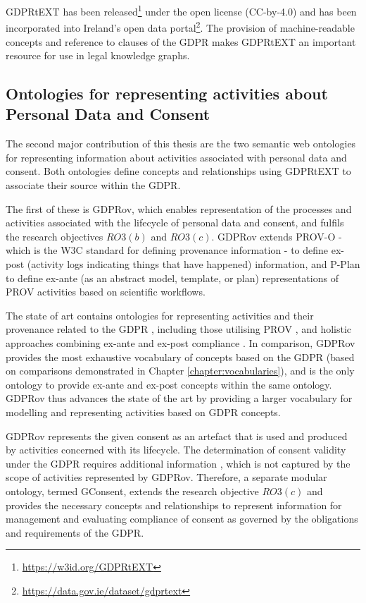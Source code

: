 GDPRtEXT has been released\footnote{\url{https://w3id.org/GDPRtEXT}} under the open license (CC-by-4.0) and has been incorporated into Ireland's open data portal\footnote{\url{https://data.gov.ie/dataset/gdprtext}}.
The provision of machine-readable concepts and reference to clauses of the GDPR makes GDPRtEXT an important resource for use in legal knowledge graphs.

\subsection{Ontologies for representing activities about Personal Data and Consent}\label{sec:contributions:ontologies}
The second major contribution of this thesis are the two semantic web ontologies for representing information about activities associated with personal data and consent. Both ontologies define concepts and relationships using GDPRtEXT to associate their source within the GDPR.

The first of these is GDPRov, which enables representation of the processes and activities associated with the lifecycle of personal data and consent, and  fulfils the research objectives $RO3(b)$ and $RO3(c)$.
GDPRov extends PROV-O \cite{lebo_prov-o:_2013} - which is the W3C standard for defining provenance information - to define ex-post (activity logs indicating things that have happened) information, and P-Plan \cite{garijo_p-plan_2014} to define ex-ante (as an abstract model, template, or plan) representations of PROV activities based on scientific workflows.

The state of art contains ontologies for representing activities and their provenance related to the GDPR \cite{pasquier_data_2018,palmirani_pronto:_2018-1}, including those utilising PROV \cite{belhajjame_provenance_2018,bonatti_special_2018-1}, and holistic approaches combining ex-ante and ex-post compliance \cite{dullaert_d3.4_2019}.
In comparison, GDPRov provides the most exhaustive vocabulary of concepts based on the GDPR (based on comparisons demonstrated in Chapter \ref{chapter:vocabularies}), and is the only ontology to provide ex-ante and ex-post concepts within the same ontology.
GDPRov thus advances the state of the art by providing a larger vocabulary for modelling and representing activities based on GDPR concepts.

GDPRov represents the given consent as an artefact that is used and produced by activities concerned with its lifecycle. The determination of consent validity under the GDPR requires additional information \cite{politou_forgetting_2018,article_29_data_protection_working_party_guidelines_2018}, which is not captured by the scope of activities represented by GDPRov. Therefore, a separate modular ontology, termed GConsent, extends the research objective $RO3(c)$ and provides the necessary concepts and relationships to represent information for management and evaluating compliance of consent as governed by the obligations and requirements of the GDPR.

